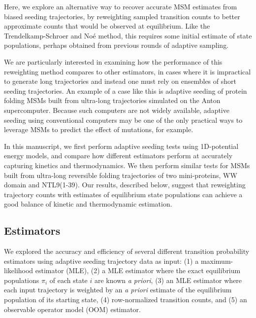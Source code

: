 \documentclass[%
 aip,
rsi,%
 amsmath,amssymb,
 reprint,%
]{revtex4-1}
\begin{document}
Here, we explore an alternative way to recover accurate MSM estimates from biased seeding trajectories, by reweighting sampled transition counts to better approximate counts that would be observed at equilibrium.  Like the Trendelkamp-Schroer and No{\'e} method,\cite{TrendelkampSchroer:2016bz} this requires some initial estimate of state populations, perhaps obtained from previous rounds of adaptive sampling.

We are particularly interested in examining how the performance of this reweighting method compares to other estimators, in cases where it is impractical to generate long trajectories and instead one must rely on ensembles of short seeding trajectories. An example of a case like this is adaptive seeding of protein folding MSMs built from ultra-long trajectories simulated on the Anton supercomputer.\cite{LindorffLarsen:2011gl} Because such computers are not widely available, adaptive seeding using conventional computers may be one of the only practical ways to leverage MSMs to predict the effect of mutations, for example. 

In this manuscript, we first perform adaptive seeding tests using 1D-potential energy models, and compare how different estimators perform at accurately capturing kinetics and thermodynamics.  We then perform similar tests for MSMs built from  ultra-long reversible folding trajectories of two mini-proteins, WW domain and NTL9(1-39). Our results, described below, suggest that reweighting trajectory counts with estimates of equilibrium state populations can achieve a good balance of kinetic and thermodynamic estimation.

\subsection*{Estimators}

We explored the accuracy and efficiency of several different transition probability estimators using  adaptive seeding trajectory data as input: (1) a maximum-likelihood estimator (MLE), (2) a MLE estimator where the exact equilibrium populations $\pi_i$ of each state $i$ are known \textit{a priori}, (3) an MLE estimator where each input trajectory is weighted by an \textit{a priori} estimate of the equilibrium population of its starting state, (4) row-normalized transition counts, and (5) an observable operator model (OOM) estimator.
\end{document}
